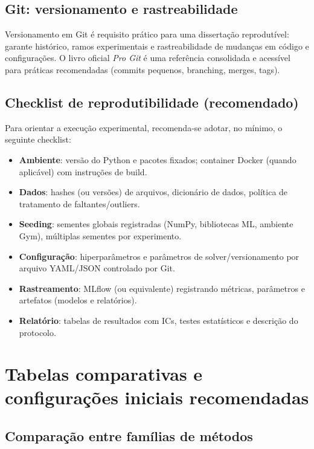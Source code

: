 \subsection{Git: versionamento e rastreabilidade}

Versionamento em Git é requisito prático para uma dissertação reprodutível: garante histórico, ramos experimentais e rastreabilidade de mudanças em código e configurações. O livro oficial \emph{Pro Git} é uma referência consolidada e acessível para práticas recomendadas (commits pequenos, branching, merges, tags). \cite{ProGitBook}

\subsection{Checklist de reprodutibilidade (recomendado)}

Para orientar a execução experimental, recomenda-se adotar, no mínimo, o seguinte checklist:
\begin{itemize}
  \item \textbf{Ambiente}: versão do Python e pacotes fixados; container Docker (quando aplicável) com instruções de build.
  \item \textbf{Dados}: hashes (ou versões) de arquivos, dicionário de dados, política de tratamento de faltantes/outliers.
  \item \textbf{Seeding}: sementes globais registradas (NumPy, bibliotecas ML, ambiente Gym), múltiplas sementes por experimento.
  \item \textbf{Configuração}: hiperparâmetros e parâmetros de solver/versionamento por arquivo YAML/JSON controlado por Git.
  \item \textbf{Rastreamento}: MLflow (ou equivalente) registrando métricas, parâmetros e artefatos (modelos e relatórios).
  \item \textbf{Relatório}: tabelas de resultados com ICs, testes estatísticos e descrição do protocolo.
\end{itemize}

\section{Tabelas comparativas e configurações iniciais recomendadas}

\subsection{Comparação entre famílias de métodos}

